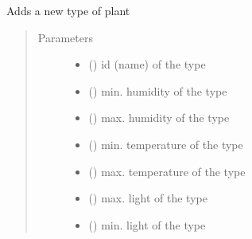 \documentclass[letterpaper,10pt,english]{sphinxmanual}
\begin{document}

\begin{fulllineitems}
\label{\detokenize{index:controller.utility.add_type}}
Adds a new type of plant
\begin{quote}\begin{description}
\item[{Parameters}] \leavevmode\begin{itemize}
\item {} 
 () \textendash{} id (name) of the type

\item {} 
 () \textendash{} min. humidity of the type

\item {} 
 () \textendash{} max. humidity of the type

\item {} 
 () \textendash{} min. temperature of the type

\item {} 
 () \textendash{} max. temperature of the type

\item {} 
 () \textendash{} max. light of the type

\item {} 
 () \textendash{} min. light of the type

\end{itemize}

\end{description}\end{quote}

\end{fulllineitems}
\end{document}
